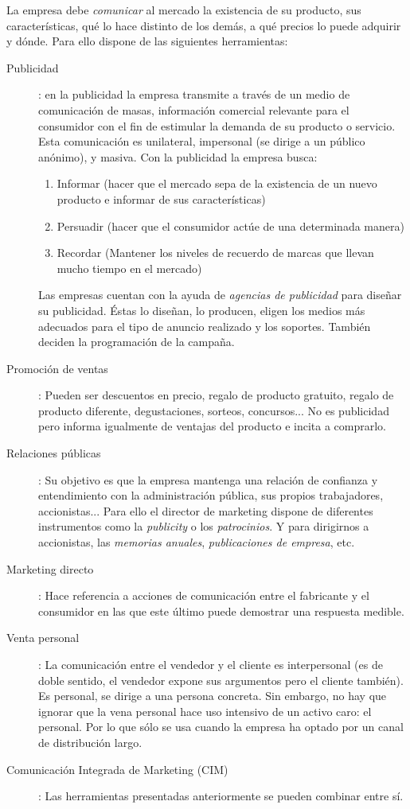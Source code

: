 \documentclass[10pt,a4paper,spanish]{report}
\begin{document}
		La empresa debe \textit{\textcolor[rgb]{0.1,0.2,0.4}{comunicar}} al mercado la existencia de su producto, sus características, qué lo hace distinto de los demás, a qué precios lo puede adquirir y dónde. Para ello dispone de las siguientes herramientas:
		\begin{description}
			\item[Publicidad]: en la publicidad la empresa transmite a través de un medio de comunicación de masas, información comercial relevante para el consumidor con el fin de estimular la demanda de su producto o servicio. Esta comunicación es unilateral, impersonal (se dirige a un público anónimo), y masiva. Con la publicidad la empresa busca:
			\begin{enumerate}
				\item Informar (hacer que el mercado sepa de la existencia de un nuevo producto e informar de sus características)
				\item Persuadir (hacer que el consumidor actúe de una determinada manera)
				\item Recordar (Mantener los niveles de recuerdo de marcas que llevan mucho tiempo en el mercado)
			\end{enumerate}
			Las empresas cuentan con la ayuda de \textit{\textcolor[rgb]{0.1,0.2,0.4}{agencias de publicidad}} para diseñar su publicidad. Éstas lo diseñan, lo producen, eligen los medios más adecuados para el tipo de anuncio realizado y los soportes. También deciden la programación de la campaña.
			\item[Promoción de ventas]: Pueden ser descuentos en precio, regalo de producto gratuito, regalo de producto diferente, degustaciones, sorteos, concursos... No es publicidad pero informa igualmente de ventajas del producto e incita a comprarlo.
			\item[Relaciones públicas]: Su objetivo es que la empresa mantenga una relación de confianza y entendimiento con la administración pública, sus propios trabajadores, accionistas...  Para ello el director de marketing dispone de diferentes instrumentos como la \textit{\textcolor[rgb]{0.1,0.2,0.4}{publicity}} o los \textit{\textcolor[rgb]{0.1,0.2,0.4}{patrocinios}}. Y para dirigirnos a accionistas, las \textit{\textcolor[rgb]{0.1,0.2,0.4}{memorias anuales}}, \textit{\textcolor[rgb]{0.1,0.2,0.4}{publicaciones de empresa}}, etc.
			\item[Marketing directo]: Hace referencia a acciones de comunicación entre el fabricante y el consumidor en las que este último puede demostrar una respuesta medible.
			\item[Venta personal]: La comunicación entre el vendedor y el cliente es interpersonal (es de doble sentido, el vendedor expone sus argumentos pero el cliente también). Es personal, se dirige a una persona concreta. Sin embargo, no hay que ignorar que la vena personal hace uso intensivo de un activo caro: el personal. Por lo que sólo se usa cuando la empresa ha optado por un canal de distribución largo.
			\item[Comunicación Integrada de Marketing (CIM)]: Las herramientas presentadas anteriormente se pueden combinar entre sí.
		\end{description}
\end{document}
